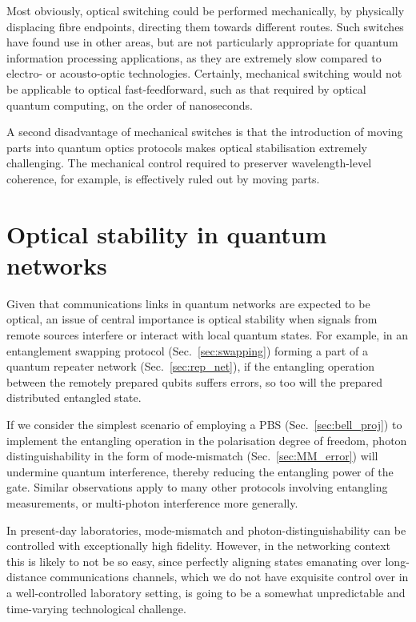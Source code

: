 \documentclass[aps, rmp, twocolumn, amsmath, amssymb, nofootinbib, superscriptaddress, longbibliography, floatfix, table-of-contents, eqsecnum]{revtex4-1}
\begin{document}
Most obviously, optical switching could be performed mechanically, by physically displacing fibre endpoints, directing them towards different routes. Such switches have found use in other areas, but are not particularly appropriate for quantum information processing applications, as they are extremely slow compared to electro- or acousto-optic technologies. Certainly, mechanical switching would not be applicable to optical fast-feedforward, such as that required by optical quantum computing, on the order of nanoseconds.

A second disadvantage of mechanical switches is that the introduction of moving parts into quantum optics protocols makes optical stabilisation extremely challenging. The mechanical control required to preserver wavelength-level coherence, for example, is effectively ruled out by moving parts.

%
%

\section{Optical stability in quantum networks} \label{sec:opt_stab} 

Given that communications links in quantum networks are expected to be optical, an issue of central importance is optical stability when signals from remote sources interfere or interact with local quantum states. For example, in an entanglement swapping protocol (Sec.~\ref{sec:swapping}) forming a part of a quantum repeater network (Sec.~\ref{sec:rep_net}), if the entangling operation between the remotely prepared qubits suffers errors, so too will the prepared distributed entangled state.

If we consider the simplest scenario of employing a PBS (Sec.~\ref{sec:bell_proj}) to implement the entangling operation in the polarisation degree of freedom, photon distinguishability in the form of mode-mismatch (Sec.~\ref{sec:MM_error}) will undermine quantum interference, thereby reducing the entangling power of the gate. Similar observations apply to many other protocols involving entangling measurements, or multi-photon interference more generally.

In present-day laboratories, mode-mismatch and photon-distinguishability can be controlled with exceptionally high fidelity. However, in the networking context this is likely to not be so easy, since perfectly aligning states emanating over long-distance communications channels, which we do not have exquisite control over in a well-controlled laboratory setting, is going to be a somewhat unpredictable and time-varying technological challenge.
\end{document}

